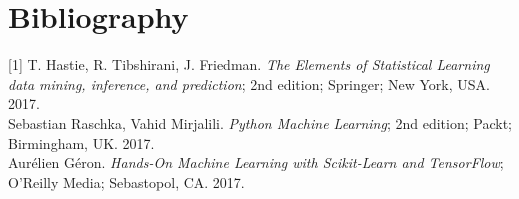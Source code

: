 \section{Bibliography}
\label{chap:Bibliography}

\label{Bib:T. Hastie, R. Tibshirani, J. Friedman}[1] T. Hastie, R. Tibshirani, J. Friedman. \textit{The Elements of Statistical Learning data mining, inference, and prediction}; 2nd edition; Springer; New York, USA. 2017.\\

\label{Bib:Sebastian Raschka, Vahid Mirjalili}\noindent [2] Sebastian Raschka, Vahid Mirjalili. \textit{Python Machine Learning}; 2nd edition; Packt; Birmingham, UK. 2017.\\

\label{Bib:Aurelien Geron}\noindent [3] Aurélien Géron. \textit{Hands-On Machine Learning with Scikit-Learn and TensorFlow}; O'Reilly Media; Sebastopol, CA. 2017.\\

